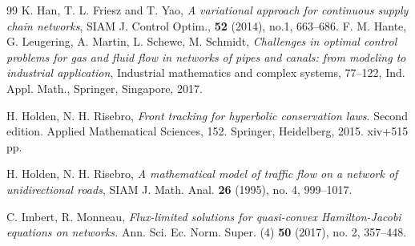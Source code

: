 \documentclass[a4paper, 10pt, final]{article}
\begin{document}
\begin{thebibliography}{99}
 K. Han, T. L. Friesz and T. Yao, 
\textsl{A variational approach for continuous supply chain networks}, SIAM J. Control Optim., {\bf 52}  (2014),
no.1, 663--686.
%
 F. M. Hante, G. Leugering, A. Martin, L. Schewe, M. Schmidt, \textsl{Challenges in optimal control problems for gas and fluid flow in networks of pipes and canals: from modeling to industrial application}, Industrial mathematics and complex systems, 77--122, Ind. Appl. Math., Springer, Singapore, 2017. 
% 
%  
%
%
%

 H. Holden, N. H. Risebro, 
  \textsl{Front tracking for hyperbolic conservation laws}. Second edition.
  Applied Mathematical Sciences, 152. Springer, Heidelberg, 2015. xiv+515 pp. 

 H. Holden, N. H. Risebro,  \textsl{A mathematical model of traffic flow on a network of unidirectional roads}, SIAM J. Math. Anal. \textbf{26} (1995), no. 4, 999--1017.

%
 
 C. Imbert, R. Monneau, \textsl{
Flux-limited solutions for quasi-convex Hamilton-Jacobi equations on networks.}
Ann. Sci. Ec. Norm. Super. (4) \textbf{50} (2017), no. 2, 357--448. 

%    
%    
%


\end{thebibliography}
\end{document}
